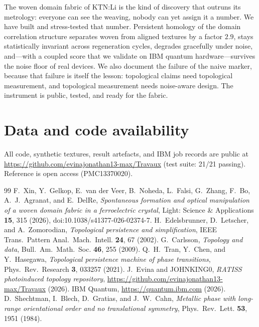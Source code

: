 \documentclass[11pt]{article}
\begin{document}
The woven domain fabric of KTN:Li \cite{Xin2026} is the kind of discovery
that outruns its metrology: everyone can see the weaving, nobody can yet
assign it a number. We have built and stress-tested that number. Persistent
homology of the domain correlation structure separates woven from aligned
textures by a factor $2.9$, stays statistically invariant across
regeneration cycles, degrades gracefully under noise, and---with a coupled
score that we validate on IBM quantum hardware---survives the noise floor of
real devices. We also document the failure of the naive marker, because that
failure is itself the lesson: topological claims need topological
measurement, and topological measurement needs noise-aware design. The
instrument is public, tested, and ready for the fabric.

\section*{Data and code availability}

All code, synthetic textures, result artefacts, and IBM job records are
public at \url{https://github.com/evinajonathan13-max/Travaux} \cite{repo}
(test suite: 21/21 passing). Reference \cite{Xin2026} is open access
(PMC13370020).

\begin{thebibliography}{99}
 F.~Xin, Y.~Gelkop, E.~van der Veer, B.~Noheda, L.~Falsi,
G.~Zhang, F.~Bo, A.~J.~Agranat, and E.~DelRe, \emph{Spontaneous formation
and optical manipulation of a woven domain fabric in a ferroelectric
crystal}, Light: Science \& Applications \textbf{15}, 315 (2026),
doi:10.1038/s41377-026-02374-7.
 H.~Edelsbrunner, D.~Letscher, and A.~Zomorodian,
\emph{Topological persistence and simplification}, IEEE Trans.~Pattern
Anal.~Mach.~Intell. \textbf{24}, 67 (2002).
 G.~Carlsson, \emph{Topology and data},
Bull.~Am.~Math.~Soc. \textbf{46}, 255 (2009).
 Q.~H.~Tran, Y.~Chen, and Y.~Hasegawa,
\emph{Topological persistence machine of phase transitions},
Phys.~Rev.~Research \textbf{3}, 033257 (2021).
 J.~Evina and JOHNKING0, \emph{RATISS photoinduced topology
repository}, \url{https://github.com/evinajonathan13-max/Travaux} (2026).
 IBM Quantum, \url{https://quantum.ibm.com} (2026).
 D.~Shechtman, I.~Blech, D.~Gratias, and
J.~W.~Cahn, \emph{Metallic phase with long-range orientational order and no
translational symmetry}, Phys.~Rev.~Lett. \textbf{53}, 1951 (1984).
\end{thebibliography}
\end{document}

